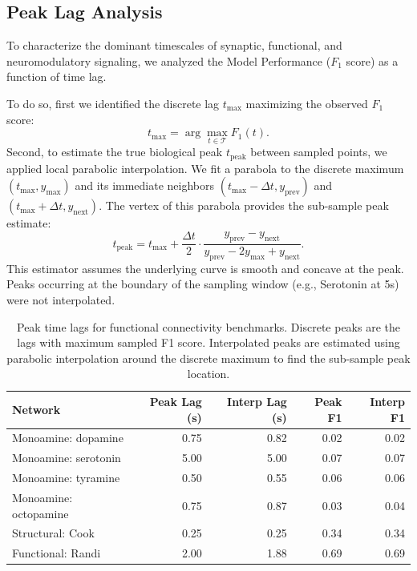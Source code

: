 \documentclass{article}
\theoremstyle{plain}
\theoremstyle{definition}
\theoremstyle{remark}
\newcommand{\1}{\mathbf{1}}
\begin{document}
\subsection{Peak Lag Analysis}
\label{app:peak_analysis}

To characterize the dominant timescales of synaptic, functional, and neuromodulatory signaling, we analyzed the Model Performance ($F_1$ score) as a function of time lag.

To do so, first we identified the discrete lag $t_{\mathrm{max}}$ maximizing the observed $F_1$ score:
\begin{equation}
t_{\mathrm{max}} = \arg\max_{t \in \mathcal{T}} F_1(t).
\end{equation}
Second, to estimate the true biological peak $t_{\mathrm{peak}}$ between sampled points, we applied local parabolic interpolation. We fit a parabola to the discrete maximum $(t_{\mathrm{max}}, y_{\mathrm{max}})$ and its immediate neighbors $(t_{\mathrm{max}}-\Delta t, y_{\mathrm{prev}})$ and $(t_{\mathrm{max}}+\Delta t, y_{\mathrm{next}})$. The vertex of this parabola provides the sub-sample peak estimate:
\begin{equation}
t_{\mathrm{peak}} = t_{\mathrm{max}} + \frac{\Delta t}{2} \cdot \frac{y_{\mathrm{prev}} - y_{\mathrm{next}}}{y_{\mathrm{prev}} - 2y_{\mathrm{max}} + y_{\mathrm{next}}}.
\end{equation}
This estimator assumes the underlying curve is smooth and concave at the peak. Peaks occurring at the boundary of the sampling window (e.g., Serotonin at 5s) were not interpolated.

\begin{table}[h]
\centering
\caption{Peak time lags for functional connectivity benchmarks. Discrete peaks are the lags with maximum sampled F1 score. Interpolated peaks are estimated using parabolic interpolation around the discrete maximum to find the sub-sample peak location.}
\label{tab:peak_lags_appendix}
\begin{small}
\begin{tabular}{lrrrr}
\toprule
Network & Peak Lag (s) & Interp Lag (s) & Peak F1 & Interp F1 \\
\midrule
Monoamine: dopamine & 0.75 & 0.82 & 0.02 & 0.02 \\
Monoamine: serotonin & 5.00 & 5.00 & 0.07 & 0.07 \\
Monoamine: tyramine & 0.50 & 0.55 & 0.06 & 0.06 \\
Monoamine: octopamine & 0.75 & 0.87 & 0.03 & 0.04 \\
Structural: Cook & 0.25 & 0.25 & 0.34 & 0.34 \\
Functional: Randi & 2.00 & 1.88 & 0.69 & 0.69 \\
\bottomrule
\end{tabular}
\end{small}
\end{table}

% 
\end{document}

